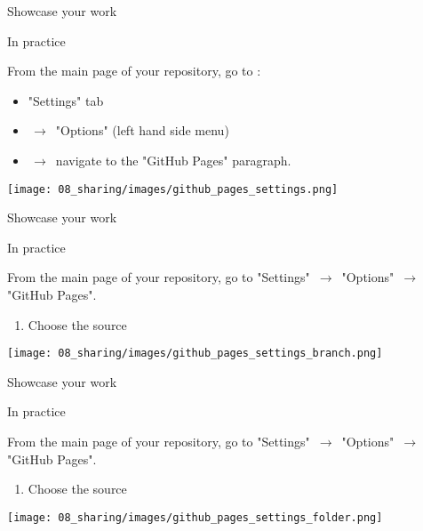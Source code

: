\begin{frame}{Showcase your work}

In practice

From the main page of your repository, go to :
\begin{itemize}
    \item "Settings" tab
    \item $\,\to\,$ "Options" (left hand side menu)
    \item $\,\to\,$ navigate to the "GitHub Pages" paragraph.
\end{itemize}

\begin{center}
    \texttt{[image: 08\_sharing/images/github\_pages\_settings.png]}
\end{center}

\end{frame}

\begin{frame}{Showcase your work}

In practice

From the main page of your repository, go to "Settings" $\,\to\,$ "Options" $\,\to\,$ "GitHub Pages".

\begin{enumerate}
    \item Choose the source
\end{enumerate}

\begin{center}
    \texttt{[image: 08\_sharing/images/github\_pages\_settings\_branch.png]}
\end{center}

\end{frame}

\begin{frame}{Showcase your work}

In practice

From the main page of your repository, go to "Settings" $\,\to\,$ "Options" $\,\to\,$ "GitHub Pages".

\begin{enumerate}
    \item Choose the source
\end{enumerate}

\begin{center}
    \texttt{[image: 08\_sharing/images/github\_pages\_settings\_folder.png]}
\end{center}

\end{frame}

